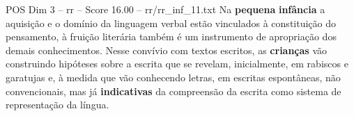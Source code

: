\begin{textsample}{POS Dim 3 – rr – Score 16.00 – rr/rr\_inf\_11.txt}
Na \textbf{pequena} \textbf{infância} a aquisição e o domínio da linguagem verbal estão vinculados à constituição do pensamento, à fruição literária também é um instrumento de apropriação dos demais conhecimentos.
Nesse convívio com textos escritos, as \textbf{crianças} vão construindo hipóteses sobre a escrita que se revelam, inicialmente, em rabiscos e garatujas e, à medida que vão conhecendo letras, em escritas espontâneas, não convencionais, mas já \textbf{indicativas} da compreensão da escrita como sistema de representação da língua.

\end{textsample}
